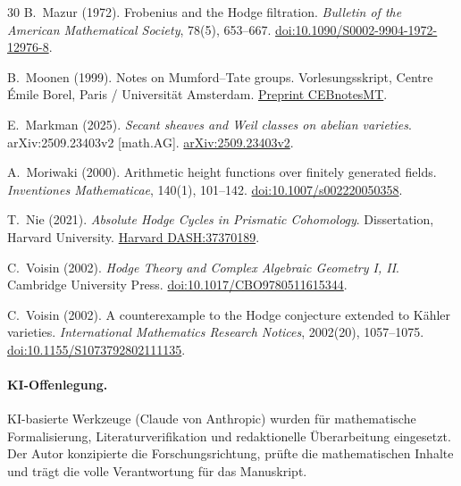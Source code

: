 \documentclass[aps,prd,twocolumn,superscriptaddress,nofootinbib]{revtex4-2}
\makeatletter
\theoremstyle{definition}
\theoremstyle{remark}
\let\auto@bib\@empty
\makeatother
\begin{document}
\begin{thebibliography}{30}
B.~Mazur (1972).
Frobenius and the Hodge filtration.
\textit{Bulletin of the American Mathematical Society}, 78(5), 653--667.
\href{https://doi.org/10.1090/S0002-9904-1972-12976-8}{doi:10.1090/S0002-9904-1972-12976-8}.

B.~Moonen (1999).
Notes on Mumford--Tate groups.
Vorlesungsskript, Centre Émile Borel, Paris / Universität Amsterdam.
\href{https://www.math.ru.nl/~bmoonen/Lecturenotes/CEBnotesMT.pdf}{Preprint CEBnotesMT}.

E.~Markman (2025).
\textit{Secant sheaves and Weil classes on abelian varieties}.
arXiv:2509.23403v2 [math.AG].
\href{https://arxiv.org/abs/2509.23403}{arXiv:2509.23403v2}.

A.~Moriwaki (2000).
Arithmetic height functions over finitely generated fields.
\textit{Inventiones Mathematicae}, 140(1), 101--142.
\href{https://doi.org/10.1007/s002220050358}{doi:10.1007/s002220050358}.

T.~Nie (2021).
\textit{Absolute Hodge Cycles in Prismatic Cohomology}.
Dissertation, Harvard University.
\href{https://nrs.harvard.edu/URN-3:HUL.INSTREPOS:37370189}{Harvard DASH:37370189}.

C.~Voisin (2002).
\textit{Hodge Theory and Complex Algebraic Geometry I, II}.
Cambridge University Press.
\href{https://doi.org/10.1017/CBO9780511615344}{doi:10.1017/CBO9780511615344}.

C.~Voisin (2002).
A counterexample to the Hodge conjecture extended to Kähler varieties.
\textit{International Mathematics Research Notices}, 2002(20), 1057--1075.
\href{https://doi.org/10.1155/S1073792802111135}{doi:10.1155/S1073792802111135}.

\end{thebibliography}

\paragraph*{KI-Offenlegung.}
KI-basierte Werkzeuge (Claude von Anthropic) wurden für mathematische Formalisierung, Literaturverifikation und redaktionelle Überarbeitung eingesetzt. Der Autor konzipierte die Forschungsrichtung, prüfte die mathematischen Inhalte und trägt die volle Verantwortung für das Manuskript.

\makeatletter
\let\test@bbl@sw\false@sw
\let\auto@bib\@empty
\makeatother
\end{document}

